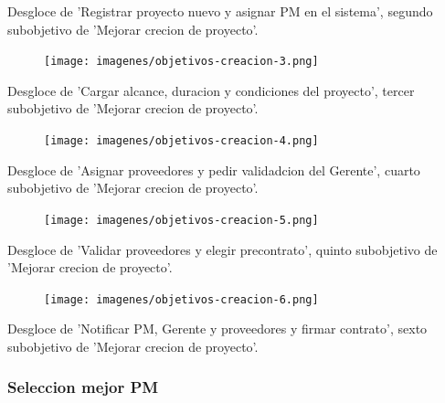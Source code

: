 Desgloce de 'Registrar proyecto nuevo y asignar PM en el sistema', segundo subobjetivo de 'Mejorar crecion de proyecto'.

\vspace{1em}

\begin{figure}[H]
	\hspace{-2cm}
    \texttt{[image: imagenes/objetivos-creacion-3.png]}
\end{figure}

Desgloce de 'Cargar alcance, duracion y condiciones del proyecto', tercer subobjetivo de 'Mejorar crecion de proyecto'.

\vspace{1em}

\begin{figure}[H]
    \centering
    \texttt{[image: imagenes/objetivos-creacion-4.png]}
\end{figure}

Desgloce de 'Asignar proveedores y pedir validadcion del Gerente', cuarto subobjetivo de 'Mejorar crecion de proyecto'.

\vspace{1em}

\begin{figure}[H]
    \centering
    \texttt{[image: imagenes/objetivos-creacion-5.png]}
\end{figure}

Desgloce de 'Validar proveedores y elegir precontrato', quinto subobjetivo de 'Mejorar crecion de proyecto'.

\vspace{1em}

\begin{figure}[H]
    \centering
    \texttt{[image: imagenes/objetivos-creacion-6.png]}
\end{figure}

Desgloce de 'Notificar PM, Gerente y proveedores y firmar contrato', sexto subobjetivo de 'Mejorar crecion de proyecto'.

\newpage

\subsubsection{Seleccion mejor PM}

